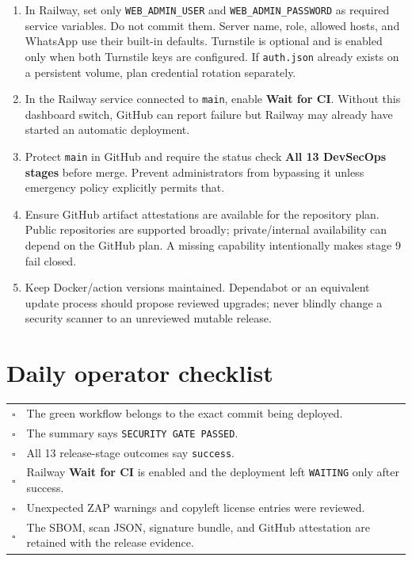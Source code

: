 \documentclass[11pt,a4paper]{article}
\begin{document}
\begin{enumerate}
  \item In Railway, set only \texttt{WEB\_ADMIN\_USER} and \texttt{WEB\_ADMIN\_PASSWORD} as required service variables. Do not commit them. Server name, role, allowed hosts, and WhatsApp use their built-in defaults. Turnstile is optional and is enabled only when both Turnstile keys are configured. If \texttt{auth.json} already exists on a persistent volume, plan credential rotation separately.
  \item In the Railway service connected to \texttt{main}, enable \textbf{Wait for CI}. Without this dashboard switch, GitHub can report failure but Railway may already have started an automatic deployment.
  \item Protect \texttt{main} in GitHub and require the status check \textbf{All 13 DevSecOps stages} before merge. Prevent administrators from bypassing it unless emergency policy explicitly permits that.
  \item Ensure GitHub artifact attestations are available for the repository plan. Public repositories are supported broadly; private/internal availability can depend on the GitHub plan. A missing capability intentionally makes stage 9 fail closed.
  \item Keep Docker/action versions maintained. Dependabot or an equivalent update process should propose reviewed upgrades; never blindly change a security scanner to an unreviewed mutable release.
\end{enumerate}

\section{Daily operator checklist}

\begin{tabularx}{\textwidth}{p{8mm}X}
\toprule
$\square$ & The green workflow belongs to the exact commit being deployed.\\
$\square$ & The summary says \texttt{SECURITY GATE PASSED}.\\
$\square$ & All 13 release-stage outcomes say \texttt{success}.\\
$\square$ & Railway \textbf{Wait for CI} is enabled and the deployment left \texttt{WAITING} only after success.\\
$\square$ & Unexpected ZAP warnings and copyleft license entries were reviewed.\\
$\square$ & The SBOM, scan JSON, signature bundle, and GitHub attestation are retained with the release evidence.\\
\bottomrule
\end{tabularx}
\end{document}
